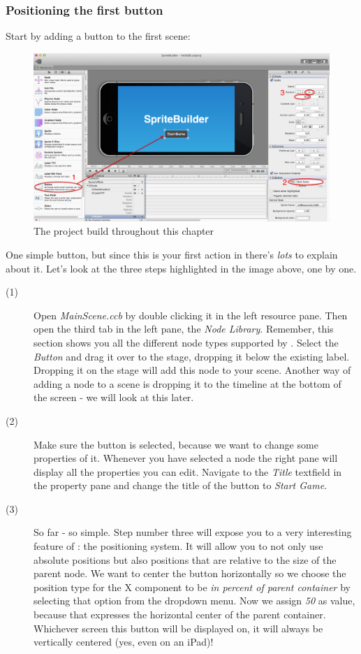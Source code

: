 \subsubsection{Positioning the first button}
\begin{leftbar}
Start by adding a button to the first scene:

\begin{figure}[H]
		\centering
		\includegraphics[width=0.9\linewidth]{images/firstproject/add_button.png}
		\caption{The project build throughout this chapter}
\end{figure}

One simple button, but since this is your first action in \SB{} there's
\textit{lots} to explain about it. Let's look at the three steps highlighted in
the image above, one by one.

\begin{description}
\item[(1)] Open \textit{MainScene.ccb} by double clicking it in the left
resource pane. Then open the third tab in the left pane, the \textit{Node
Library}. Remember, this section shows you all the different node types
supported by \SB{}. Select the \textit{Button} and drag it over to the stage,
dropping it below the existing label. Dropping it on the stage will add this
node to your scene. Another way of adding a node to a scene is dropping it to
the timeline at the bottom of the screen - we will look at this later.
\item[(2)] Make sure the button is selected, because we want to change some
properties of it. Whenever you have selected a node the right pane will display
all the properties you can edit. Navigate to the \textit{Title} textfield in the
property pane and change the title of the button to \textit{Start Game}.
\item[(3)] So far - so simple. Step number three will expose you to a very
interesting feature of \SB{}: the positioning system. It will allow you to not
only use absolute positions but also positions that are relative to the size of
the parent node. We want to center the button horizontally so we choose the
position type for the X component to be \textit{in percent of parent
container} by selecting that option from the dropdown menu. Now we assign
\textit{50} as value, because that expresses the horizontal center of the parent
container. Whichever screen this button will be displayed on, it will always be
vertically centered (yes, even on an iPad)!
\end{description}
\end{leftbar}

